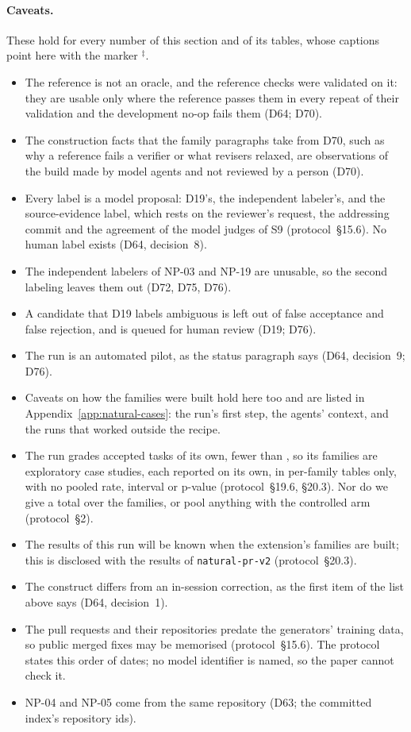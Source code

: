 \paragraph{Caveats.}
These hold for every number of this section and of its tables, whose captions point here with the marker
$^{\ddagger}$.
\begin{itemize}
\item The reference is not an oracle, and the reference checks were validated on it: they are usable only where the
  reference passes them in every repeat of their validation and the development no-op fails them (D64; D70).
\item The construction facts that the family paragraphs take from D70, such as why a reference fails a verifier or what
  revisers relaxed, are observations of the build made by model agents and not reviewed by a person (D70).
\item Every label is a model proposal: D19's, the independent labeler's, and the source-evidence label, which rests on
  the reviewer's request, the addressing commit and the agreement of the model judges of S9 (protocol~\S15.6). No human
  label exists (D64, decision~8).
\item The independent labelers of NP-03 and NP-19 are unusable, so the second labeling leaves them out (D72, D75, D76).
\item A candidate that D19 labels ambiguous is left out of false acceptance and false rejection, and is queued for human
  review (D19; D76).
\item The run is an automated pilot, as the status paragraph says (D64, decision~9; D76).
\item Caveats on how the families were built hold here too and are listed in Appendix~\ref{app:natural-cases}:
  the run's first step, the agents' context, and the runs that worked outside the recipe.
\item The run grades  accepted tasks of its own, fewer than , so its families are
  exploratory case studies, each reported on its own, in per-family tables only, with no pooled rate, interval or
  p-value (protocol~\S19.6, \S20.3). Nor do we give a total over the families, or pool anything with the controlled arm
  (protocol~\S2).
\item The results of this run will be known when the extension's families are built; this is disclosed with the results
  of \texttt{natural-pr-v2} (protocol~\S20.3).
\item The construct differs from an in-session correction, as the first item of the list above says (D64, decision~1).
\item The pull requests and their repositories predate the generators' training data, so public merged fixes may be
  memorised (protocol~\S15.6). The protocol states this order of dates; no model identifier is named, so the paper
  cannot check it.
\item NP-04 and NP-05 come from the same repository (D63; the committed index's repository ids).
\end{itemize}

